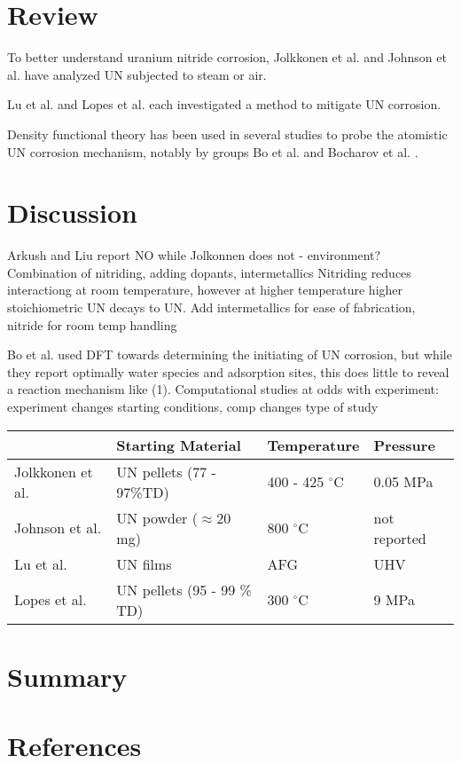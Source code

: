 \documentclass[3p,review,11pt]{elsarticle}
\begin{document}
\section{Review}


To better understand uranium nitride corrosion, Jolkkonen et al. \cite{Jolkkonen2017} and Johnson et al. \cite{Johnson2016} have analyzed UN subjected to steam or air. 

Lu et al. \cite{Lu2016} and Lopes et al. \cite{Lopes2017} each investigated a method to mitigate UN corrosion. 

Density functional theory has been used in several studies to probe the atomistic UN corrosion mechanism, notably by groups Bo et al. \cite{Bo2016} and Bocharov et al. \cite{Bocharov2013}.



\section{Discussion}
Arkush and Liu report NO while Jolkonnen does not - environment?
Combination of nitriding, adding dopants, intermetallics
Nitriding reduces interactiong at room temperature, however at higher temperature higher stoichiometric UN decays to UN.
Add intermetallics for ease of fabrication, nitride for room temp handling
\par 

Bo et al. \cite{Bo2016} used DFT towards determining the initiating of UN corrosion, but while they report optimally water species and adsorption sites, this does little to reveal a reaction mechanism like (1).
Computational studies at odds with experiment: experiment changes starting conditions, comp changes type of study


\begin{tabular}{ |p{3cm}|p{3cm}|p{3cm}|p{3cm}|  }
	\hline
	 & Starting Material &Temperature & Pressure\\
	\hline
	Jolkkonen et al. \cite{Jolkkonen2017}   &  UN pellets (77 - 97\%TD) &400 - 425 $^{\circ}$C&  0.05 MPa \\
	Johnson et al. \cite{Johnson2016}   & UN powder ($\approx$20 mg)     &800 $^{\circ}$C&  not reported \\
	Lu et al. \cite{Lu2016}  & UN films    &AFG&   UHV \\
	Lopes et al. \cite{Lopes2017}   & UN pellets (95 - 99 \% TD)    & 300 $^{\circ}$C&   9 MPa \\
	\hline
\end{tabular}
\section{Summary}











\section*{References}




\end{document}
